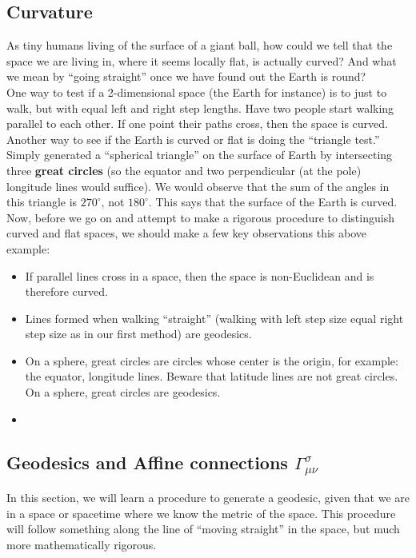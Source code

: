 \documentclass{article}
\theoremstyle{definition}
\begin{document}
\subsection{Curvature}
As tiny humans living of the surface of a giant ball, how could we tell that the space we are living in, where it seems locally flat, is actually curved? And what we mean by ``going straight'' once we have found out the Earth is round?\\

One way to test if a 2-dimensional space (the Earth for instance) is to just to walk, but with equal left and right step lengths. Have two people start walking parallel to each other. If one point their paths cross, then the space is curved.\\

Another way to see if the Earth is curved or flat is doing the ``triangle test.'' Simply generated a ``spherical triangle'' on the surface of Earth by intersecting three \textbf{great circles} (so the equator and two perpendicular (at the pole) longitude lines would suffice). We would observe that the sum of the angles in this triangle is $270^\circ$, not $180^\circ$. This says that the surface of the Earth is curved.\\

Now, before we go on and attempt to make a rigorous procedure to distinguish curved and flat spaces, we should make a few key observations this above example: 
\begin{itemize}
	\item If parallel lines cross in a space, then the space is non-Euclidean and is therefore curved. 
	\item Lines formed when walking ``straight'' (walking with left step size equal right step size as in our first method) are geodesics. 
	\item On a sphere, great circles are circles whose center is the origin, for example: the equator, longitude lines. Beware that latitude lines are not great circles. On a sphere, great circles are geodesics. 
	\item 
\end{itemize}

\subsection{Geodesics and Affine connections $\Gamma^{\sigma}_{\mu\nu}$}
In this section, we will learn a procedure to generate a geodesic, given that we are in a space or spacetime where we know the metric of the space. This procedure will follow something along the line of ``moving straight'' in the space, but much more mathematically rigorous.\\
\end{document}
